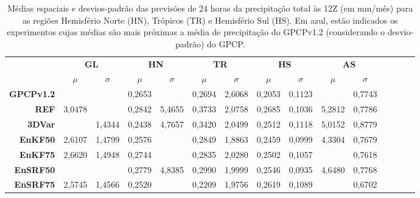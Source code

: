 \begin{table}[H]
\caption{Médias espaciais e desvios-padrão das previsões de 24 horas da precipitação total às 12Z (em mm/mês) para as regiões Hemisfério Norte (HN), Trópicos (TR) e Hemisfério Sul (HS). Em azul, estão indicados os experimentos cujas médias são mais próximas a média de precipitação do GPCPv1.2 (considerando o desvio-padrão) do GPCP.}
\begin{center}
\begin{adjustbox}{max width=\textwidth}
\begin{tabular}{rcccccccccccccc}
\toprule
\toprule
        & \multicolumn{2}{c}{\textbf{GL}} & \multicolumn{2}{c}{\textbf{HN}} & \multicolumn{2}{c}{\textbf{TR}} & \multicolumn{2}{c}{\textbf{HS}} & \multicolumn{2}{c}{\textbf{AS}} \\
\cmidrule(lr{.75em}){2-3} \cmidrule(lr{.75em}){4-5} \cmidrule(lr{.75em}){6-7} \cmidrule(lr{.75em}){8-9} \cmidrule(lr{.75em}){10-11}
        & $\mu$    &$\sigma$ & $\mu$   & $\sigma$ & $\mu$   & $\sigma$ & $\mu$                & $\sigma$ & $\mu$                & $\sigma$ \\ 
\midrule
\textbf{GPCPv1.2}    & \color{blue}{2,8635} & \color{blue}{1,7228} & 0,2653 & \color{blue}{4,2820} & 0,2694 & 2,6068 & 0,2053 & 0,1123   & \color{blue}{3,1321} & 0,7743 \\
\textbf{REF}     & 3,0478               & \color{blue}{1,5547} & 0,2842 & 5,4655               & 0,3733 & 2,0758 & 0,2685 & 0,1036   & 5,2812               & 0,7786 \\
\textbf{3DVar}   & \color{blue}{2,7601} & 1,4344               & 0,2438 & 4,7657               & 0,3420 & 2,0499 & 0,2512 & 0,1118   & 5,0152               & 0,8779 \\
\textbf{EnKF50}  & 2,6107               & 1,4799               & 0,2576 & \color{blue}{4,4379} & 0,2849 & 1,8863 & 0,2459 & 0,0999   & 4,3304               & 0,7679 \\
\textbf{EnKF75}  & 2,6620               & 1,4948               & 0,2744 & \color{blue}{4,4412} & 0,2835 & 2,0280 & 0,2502 & 0,1057   & \color{blue}{3,8494} & 0,7618 \\
\textbf{EnSRF50} & \color{blue}{2,8103} & \color{blue}{1,5605} & 0,2779 & 4,8385               & 0,2990 & 1,9999 & 0,2546 & 0,0935   & 4,6480               & 0,7768 \\
\textbf{EnSRF75} & 2,5745               & 1,4566               & 0,2520 & \color{blue}{4,2710} & 0,2209 & 1,9756 & 0,2619 & 0,1089   & \color{blue}{3,8128} & 0,6702 \\ 
\bottomrule                                         
\end{tabular}
\end{adjustbox}
\end{center}
\label{tab:prec_aave_regs_sh_tr_sh}
\end{table}

